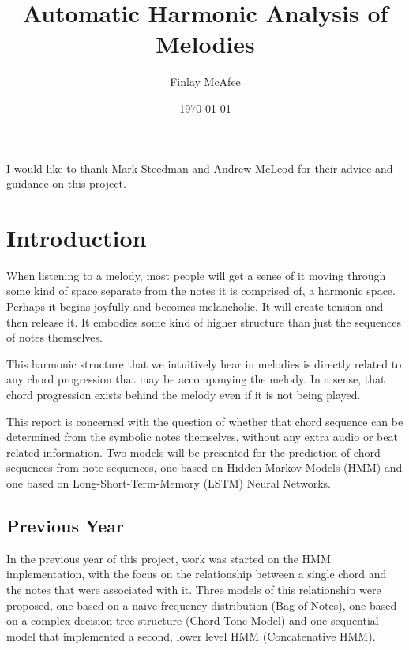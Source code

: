 \documentclass[bsc,singlespacing,logo, parskip, deptreport]{infthesis}
\begin{document}
\title{Automatic Harmonic Analysis of Melodies}

\author{Finlay McAfee}


\date{\today}

\abstract{
}

\maketitle
\begin{acknowledgements}
I would like to thank Mark Steedman and Andrew McLeod for their advice and guidance on this project.
\end{acknowledgements}
\standarddeclaration
\tableofcontents


\chapter{Introduction}

When listening to a melody, most people will get a sense of it moving through some kind of space separate from the notes it is comprised of, a harmonic space. Perhaps it begins joyfully and becomes melancholic. It will create tension and then release it. It embodies some kind of higher structure than just the sequences of notes themselves.

This harmonic structure that we intuitively hear in melodies is directly related to any chord progression that may be accompanying the melody. In a sense, that chord progression exists behind the melody even if it is not being played.

This report is concerned with the question of whether that chord sequence can be determined from the symbolic notes themselves, without any extra audio or beat related information. Two models will be presented for the prediction of chord sequences from note sequences, one based on Hidden Markov Models (HMM) and one based on Long-Short-Term-Memory (LSTM) Neural Networks.

\section{Previous Year}

In the previous year of this project, work was started on the HMM implementation, with the focus on the relationship between a single chord and the notes that were associated with it. Three models of this relationship were proposed, one based on a naive frequency distribution (Bag of Notes), one based on a complex decision tree structure (Chord Tone Model) and one sequential model that implemented a second, lower level HMM (Concatenative HMM).
\end{document}
